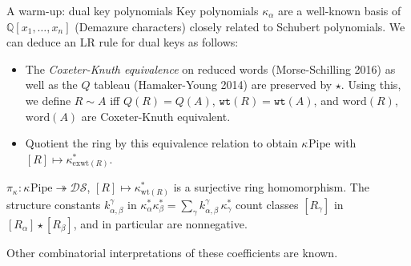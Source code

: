 \documentclass[aspectratio=169]{beamer}
\newcommand{\dcoma}{\mathcal{DS}}
\newcommand{\Key}[1]{\kappa_{#1}}
\newcommand{\RC}{\mathrm{Pipe}}
\newcommand{\wtt}{\mathtt{wt}}
\begin{document}
\begin{frame}{A warm-up: dual key polynomials}
  Key polynomials $\Key{\alpha}$ are a well-known basis of $\mathbb{Q}[x_1,\dots,x_n]$ (Demazure characters) closely related to Schubert polynomials. We can deduce an LR rule for dual keys as follows:
  \begin{itemize}
    \item The \emph{Coxeter-Knuth equivalence}  on reduced words \cite{morse2016crystal} (Morse-Schilling 2016) as well as the $Q$ tableau \cite{hamaker2014relating} (Hamaker-Young 2014) are preserved by $\star$. Using this, we define $R\sim A$ iff $Q(R)=Q(A)$, $\wtt(R)=\wtt(A)$, and $\mathrm{word}(R)$, $\mathrm{word}(A)$ are Coxeter-Knuth equivalent.
    \item Quotient the ring by this equivalence relation to obtain $\Key{}\RC$ with $[R]\mapsto\Key{\mathrm{exwt}(R)}^*$.
  \end{itemize}
  \begin{theorem}[S, 2026+]
    $\pi_{\Key{}}:\Key{}\RC \twoheadrightarrow \dcoma$, $[R]\mapsto\Key{\mathrm{wt}(R)}^*$ is a surjective ring homomorphism. The structure constants $k_{\alpha,\beta}^\gamma$ in $\Key{\alpha}^*\Key{\beta}^* = \sum_\gamma k_{\alpha,\beta}^\gamma\,\Key{\gamma}^*$ count classes $[R_\gamma]$ in $[R_\alpha]\star[R_\beta]$, and in particular are nonnegative.
  \end{theorem}
  \vspace{12pt}
  Other combinatorial interpretations of these coefficients are known.
\end{frame}


\end{document}
